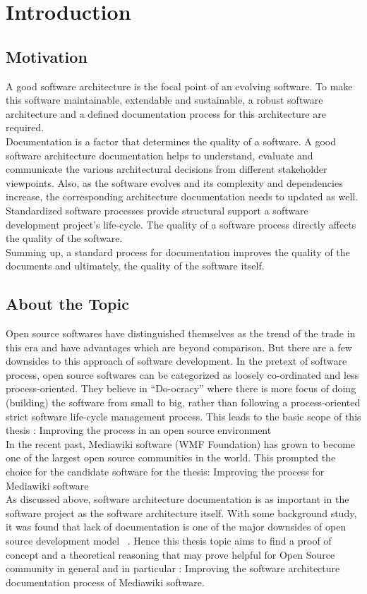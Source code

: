 \chapter{Introduction}\label{chapter:Introduction}

\section{Motivation}\label{sec:motiv}
\indent A good software architecture is the focal point of an evolving software.  To make this software maintainable, extendable and sustainable, a robust software architecture and a defined documentation process for this architecture are required.
\\\indent Documentation is a factor that determines the quality of a software. A good software architecture documentation helps to understand, evaluate and communicate the various architectural decisions from different stakeholder viewpoints. Also, as the software evolves and its complexity and dependencies increase, the corresponding architecture documentation needs to updated as well.
\\\indent Standardized software processes provide structural support a software development project's life-cycle. The quality of a software process directly affects the quality of the software.
\\\indent Summing up, a standard process for documentation improves the quality of the documents and ultimately, the quality of the software itself.

\section{About the Topic}\label{sec:about}
\indent Open source softwares have distinguished themselves as the trend of the trade in this era and have advantages which are beyond comparison. But there are a few downsides to this approach of software development. In the pretext of software process, open source softwares can be categorized as loosely co-ordinated and less process-oriented. They believe in \enquote{Do-ocracy} where there is more focus of doing (building) the software from small to big, rather than following a process-oriented strict software life-cycle management process. This leads to the basic scope of this thesis : Improving the process in an open source environment
\\\indent In the recent past, Mediawiki software (WMF Foundation) has grown to become one of the largest open source communities in the world. This prompted the choice for the candidate software for the thesis: Improving the process for Mediawiki software
\\\indent As discussed above, software architecture documentation is as important in the software project as the software architecture itself. With some background study, it was found that lack of documentation is one of the major downsides of open source development model ~\cite{OssDoc}. Hence this thesis topic aims to find a proof of concept  and a theoretical reasoning that may prove helpful for Open Source community in general and in particular  : Improving the software architecture documentation process of Mediawiki software.

